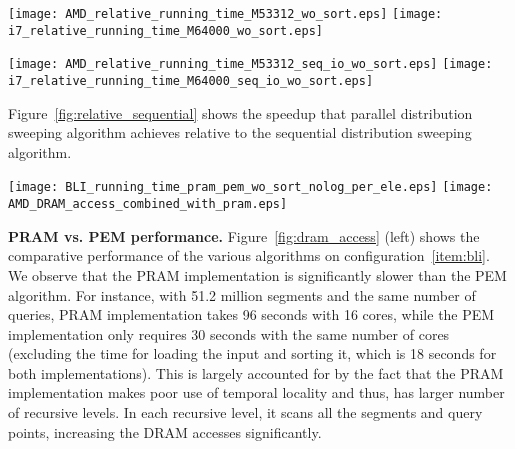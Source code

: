 \begin{figure*}[!htb]
\center
\texttt{[image: AMD\_relative\_running\_time\_M53312\_wo\_sort.eps]}
\hspace{1cm}
\texttt{[image: i7\_relative\_running\_time\_M64000\_wo\_sort.eps]}
\caption{Speedup of the distribution sweeping algorithms relative to the plane
sweep algorithm on the configuration~\ref{item:amd} (left) and configuration~\ref{item:intel} (right). The
plots exclude the times to perform initial sorting of inputs by the
$y$-coordinate for distribution sweeping and $x$-coordinate for the plane sweep.}
\label{fig:relative_linesweep}
\end{figure*}

\begin{figure*}[!htb]
\center
\texttt{[image: AMD\_relative\_running\_time\_M53312\_seq\_io\_wo\_sort.eps]}
\hspace{1cm}
\texttt{[image: i7\_relative\_running\_time\_M64000\_seq\_io\_wo\_sort.eps]}
\caption{Speedup of the parallel distribution sweeping algorithms relative to the sequential distribution sweeping
algorithm on configuration~\ref{item:amd} (left) and configuration~\ref{item:intel} (right) systems. The plots exclude the times to perform initial sorting of inputs by the $y$-coordinate.}
\label{fig:relative_sequential}
\end{figure*}

Figure~\ref{fig:relative_sequential} shows the speedup that parallel
distribution sweeping algorithm achieves relative to the sequential
distribution sweeping algorithm. 

\begin{figure*}[!htb]
\center
\texttt{[image: BLI\_running\_time\_pram\_pem\_wo\_sort\_nolog\_per\_ele.eps]}
\hspace{1cm}
\texttt{[image: AMD\_DRAM\_access\_combined\_with\_pram.eps]}
\caption{Comparison of PEM and PRAM algorithms on 16 cores of
  configuration~\ref{item:bli} is shown in the left figure. Running time and DRAM
  traffic for long segments on 12 cores of configuration~\ref{item:amd}
  in the right.}
\label{fig:dram_access}
\end{figure*}

\textbf{PRAM vs. PEM performance.} Figure~\ref{fig:dram_access} (left) shows the comparative
performance of the various algorithms on configuration~\ref{item:bli}. We observe
that the PRAM implementation is significantly slower than the PEM
algorithm. For instance, with 51.2 million segments and the same
number of queries, PRAM implementation takes 96 seconds with 16
cores, while the PEM implementation only requires 30 seconds with the
same number of cores (excluding the time for loading the input and
sorting it, which is 18 seconds for both implementations). This is
largely accounted for by the fact that the PRAM implementation makes
poor use of temporal locality and thus, has larger number of recursive
levels. In each recursive level, it scans all the segments and query
points, increasing the DRAM accesses significantly. 

